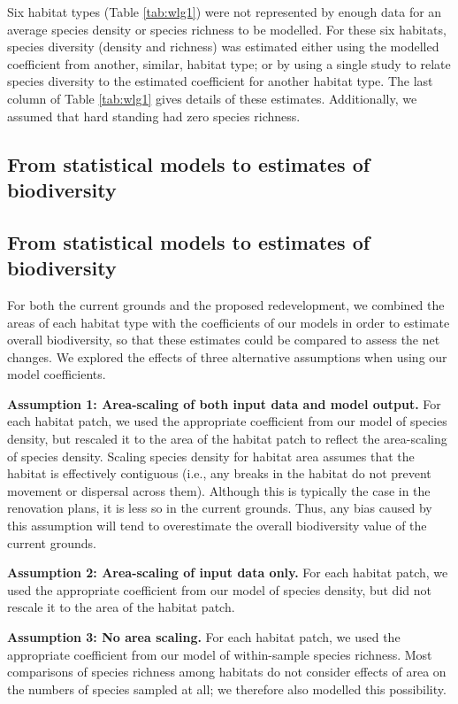 Six habitat types (Table \ref{tab:wlg1}) were not represented by enough data for an average species density or species richness to be modelled. For these six habitats, species diversity (density and richness) was estimated either using the modelled coefficient from another, similar, habitat type; or by using a single study to relate species diversity to the estimated coefficient for another habitat type. The last column of Table \ref{tab:wlg1} gives details of these estimates. Additionally, we assumed that hard standing had zero species richness.

\ifappendixStyle %
\subsection{From statistical models to estimates of biodiversity}%
\else
\subsection*{From statistical models to estimates of biodiversity}
\fi

For both the current grounds and the proposed redevelopment, we combined the areas of each habitat type with the coefficients of our models in order to estimate overall biodiversity, so that these estimates could be compared to assess the net changes. We explored the effects of three alternative assumptions when using our model coefficients.

\textbf{Assumption 1: Area-scaling of both input data and model output.} For each habitat patch, we used the appropriate coefficient from our model of species density, but rescaled it to the area of the habitat patch to reflect the area-scaling of species density. Scaling species density for habitat area assumes that the habitat is effectively contiguous (i.e., any breaks in the habitat do not prevent movement or dispersal across them). Although this is typically the case in the renovation plans, it is less so in the current grounds. Thus, any bias caused by this assumption will tend to overestimate the overall biodiversity value of the current grounds.

\textbf{Assumption 2: Area-scaling of input data only.} For each habitat patch, we used the appropriate coefficient from our model of species density, but did not rescale it to the area of the habitat patch. 

\textbf{Assumption 3: No area scaling.} For each habitat patch, we used the appropriate coefficient from our model of within-sample species richness. Most comparisons of species richness among habitats do not consider effects of area on the numbers of species sampled at all; we therefore also modelled this possibility.

